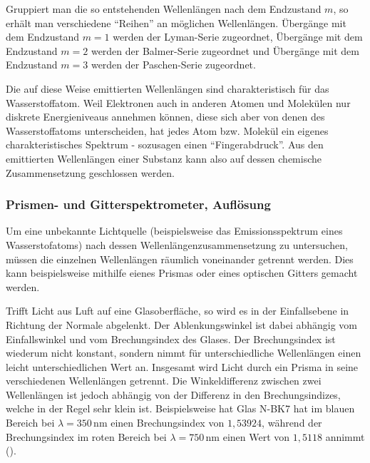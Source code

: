 \documentclass{article}
\newcommand{\result}[2]{
    #1 \, \text{#2}
}
\begin{document}
Gruppiert man die so entstehenden Wellenlängen nach dem Endzustand $m$,
so erhält man verschiedene ``Reihen'' an möglichen Wellenlängen.
Übergänge mit dem Endzustand $m = 1$ werden der Lyman-Serie zugeordnet,
Übergänge mit dem Endzustand $m = 2$ werden der Balmer-Serie zugeordnet und
Übergänge mit dem Endzustand $m = 3$ werden der Paschen-Serie zugeordnet.

Die auf diese Weise emittierten Wellenlängen sind charakteristisch für das
Wasserstoffatom. Weil Elektronen auch in anderen Atomen und Molekülen
nur diskrete Energieniveaus annehmen können, diese sich aber von denen des
Wasserstoffatoms unterscheiden, hat jedes Atom bzw. Molekül ein eigenes
charakteristisches Spektrum - sozusagen einen ``Fingerabdruck''.
Aus den emittierten Wellenlängen einer Substanz kann also auf dessen chemische
Zusammensetzung geschlossen werden.

\subsubsection{Prismen- und Gitterspektrometer, Auflösung}

Um eine unbekannte Lichtquelle (beispielsweise das Emissionsspektrum eines
Wasserstofatoms) nach dessen Wellenlängenzusammensetzung zu untersuchen,
müssen die einzelnen Wellenlängen räumlich voneinander getrennt werden.
Dies kann beispielsweise mithilfe eienes Prismas oder eines optischen
Gitters gemacht werden.

Trifft Licht aus Luft auf eine Glasoberfläche, so wird es in der Einfallsebene
in Richtung der Normale abgelenkt. Der Ablenkungswinkel ist dabei abhängig vom
Einfallswinkel und vom Brechungsindex des Glases. Der Brechungsindex ist
wiederum nicht konstant, sondern nimmt für unterschiedliche Wellenlängen einen
leicht unterschiedlichen Wert an.
Insgesamt wird Licht durch ein Prisma in seine verschiedenen Wellenlängen getrennt.
Die Winkeldifferenz zwischen zwei Wellenlängen ist jedoch abhängig von der
Differenz in den Brechungsindizes, welche in der Regel sehr klein ist.
Beispielsweise hat Glas N-BK7 hat im blauen Bereich bei $\lambda = \result{350}{nm}$
einen Brechungsindex von $1,53924$, während der Brechungsindex im roten Bereich
bei $\lambda = \result{750}{nm}$ einen Wert von $1,5118$ annimmt (\cite{refractive}).
\end{document}
